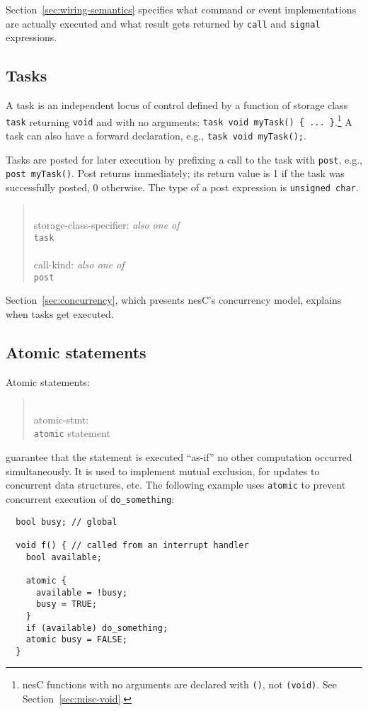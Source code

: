 \documentclass[11pt,letterpaper]{article}
\newcommand{\kw}[1]{{\tt #1}}
\newcommand{\code}[1]{{\tt #1}}
\newcommand{\nesc}{nesC\xspace}
\newcommand{\grammarshift}{\vspace*{-.7cm}}
\newcommand{\grammarindent}{\hspace*{2cm}\= \\ \kill}
\begin{document}
Section~\ref{sec:wiring-semantics} specifies what command or event
implementations are actually executed and what result gets returned by
\code{call} and \code{signal} expressions.

\subsection{Tasks}

A task is an independent locus of control defined by a function of
storage class \kw{task} returning \kw{void} and with no arguments:
\code{task void myTask() \{ ... \}}.\footnote{\nesc functions with no
arguments are declared with \code{()}, not \code{(void)}. See
Section~\ref{sec:misc-void}.} A task can also have a forward declaration, e.g.,
\code{task void myTask();}.

Tasks are posted for later execution by prefixing a call to the task
with \kw{post}, e.g., \code{post myTask()}. Post returns immediately;
its return value is 1 if the task was successfully posted, 0
otherwise. The type of a post expression is \code{unsigned char}.
\begin{quote} \grammarshift \em \begin{tabbing}
\grammarindent
storage-class-specifier: \emph{also one of}\\
\>	\kw{task}\\
\\
call-kind: \emph{also one of}\\
\>	\kw{post}
\end{tabbing} \end{quote}
Section~\ref{sec:concurrency}, which presents \nesc's concurrency
model, explains when tasks get executed.

\subsection{Atomic statements}

Atomic statements:
\begin{quote} \grammarshift \em \begin{tabbing}
\grammarindent
atomic-stmt: \\
\>	\kw{atomic} statement\\
\end{tabbing} \end{quote}
guarantee that the statement is executed ``as-if'' no other computation
occurred simultaneously. It is used to implement mutual exclusion, for
updates to concurrent data structures, etc. The following example
uses \kw{atomic} to prevent concurrent execution of \code{do\_something}:
\begin{verbatim}
  bool busy; // global

  void f() { // called from an interrupt handler
    bool available;

    atomic {
      available = !busy;
      busy = TRUE;
    }
    if (available) do_something;
    atomic busy = FALSE;
  }
\end{verbatim}
\end{document}
